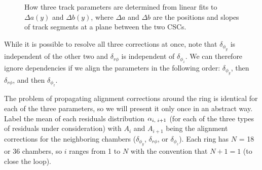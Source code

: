 \begin{figure}
 \hfill {} \hfill {}
\caption{How three track parameters are determined from linear fits to $\Delta a(y)$ and $\Delta b(y)$, where $\Delta a$ and $\Delta b$ are the positions and slopes of track segments at a plane between the two CSCs.  \label{fig:overlaps_parameters}}
\end{figure}

While it is possible to resolve all three corrections at once, note
that $\delta_{\phi_y}$ is independent of the other two and
$\delta_{r\phi}$ is independent of $\delta_{\phi_z}$.  We can
therefore ignore dependencies if we align the parameters in the
following order: $\delta_{\phi_y}$, then $\delta_{r\phi}$, and then
$\delta_{\phi_z}$.

The problem of propagating alignment corrections around the ring is
identical for each of the three parameters, so we will present it only
once in an abstract way.  Label the mean of each residuals
distribution $\alpha_{i\mbox{\scriptsize, }i+1}$ (for each of the
three types of residuals under consideration) with $A_i$ and $A_{i+1}$
being the alignment corrections for the neighboring chambers
($\delta_{\phi_y}$, $\delta_{r\phi}$, or $\delta_{\phi_z}$).  Each
ring has $N$ = 18 or 36 chambers, so $i$ ranges from 1 to $N$ with the
convention that $N+1 = 1$ (to close the loop).

